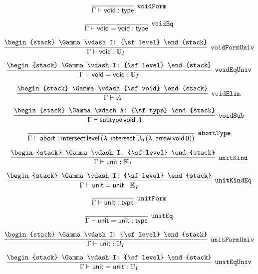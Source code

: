 \[
\infer[{\tt voidForm}]{\Gamma \vdash {\sf void}: {\sf type}}{}
\]

\[
\infer[{\tt voidEq}]{\Gamma \vdash {\sf void}= {\sf void}: {\sf type}}{}
\]

\[
\infer[{\tt voidFormUniv}]{\Gamma \vdash {\sf void}: {\Bbb U}_{I}}{
\begin{stack}
\Gamma \vdash I: {\sf level}
\end{stack}}
\]

\[
\infer[{\tt voidEqUniv}]{\Gamma \vdash {\sf void}= {\sf void}: {\Bbb U}_{I}}{
\begin{stack}
\Gamma \vdash I: {\sf level}
\end{stack}}
\]

\[
\infer[{\tt voidElim}]{\Gamma \vdash A}{
\begin{stack}
\Gamma \vdash {\sf void}
\end{stack}}
\]

\[
\infer[{\tt voidSub}]{\Gamma \vdash {\sf subtype}\,{\sf void}\,A}{
\begin{stack}
\Gamma \vdash A: {\sf type}
\end{stack}}
\]

\[
\infer[{\tt abortType}]{\Gamma \vdash {\sf abort}: {\sf intersect}\,{\sf level}\,(\lambda .\,{\sf intersect}\,{\Bbb U}_{0}\,(\lambda .\,{\sf arrow}\,{\sf void}\,0))}{}
\]

\[
\infer[{\tt unitKind}]{\Gamma \vdash {\sf unit}: {\Bbb K}_{I}}{
\begin{stack}
\Gamma \vdash I: {\sf level}
\end{stack}}
\]

\[
\infer[{\tt unitKindEq}]{\Gamma \vdash {\sf unit}= {\sf unit}: {\Bbb K}_{I}}{
\begin{stack}
\Gamma \vdash I: {\sf level}
\end{stack}}
\]

\[
\infer[{\tt unitForm}]{\Gamma \vdash {\sf unit}: {\sf type}}{}
\]

\[
\infer[{\tt unitEq}]{\Gamma \vdash {\sf unit}= {\sf unit}: {\sf type}}{}
\]

\[
\infer[{\tt unitFormUniv}]{\Gamma \vdash {\sf unit}: {\Bbb U}_{I}}{
\begin{stack}
\Gamma \vdash I: {\sf level}
\end{stack}}
\]

\[
\infer[{\tt unitEqUniv}]{\Gamma \vdash {\sf unit}= {\sf unit}: {\Bbb U}_{I}}{
\begin{stack}
\Gamma \vdash I: {\sf level}
\end{stack}}
\]

